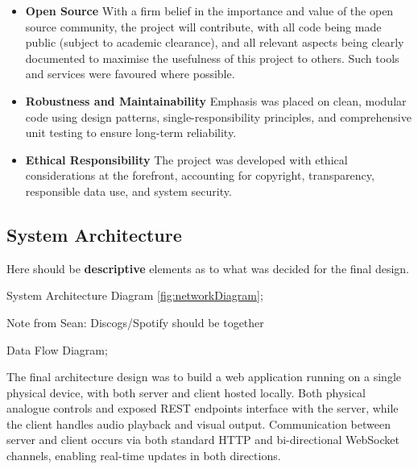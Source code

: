             \begin{itemize}
                \item \textbf{Open Source} With a firm belief in the importance and value of the open source community, the project will contribute, with all code being made public (subject to academic clearance), and all relevant aspects being clearly documented to maximise the usefulness of this project to others. Such tools and services were favoured where possible.
            \end{itemize}
    
            \begin{itemize}
                \item \textbf{Robustness and Maintainability} Emphasis was placed on clean, modular code using design patterns, single-responsibility principles, and comprehensive unit testing to ensure long-term reliability.
            \end{itemize}
    
            \begin{itemize}
                \item \textbf{Ethical Responsibility} The project was developed with ethical considerations at the forefront, accounting for copyright, transparency, responsible data use, and system security.
            \end{itemize}
        
        \subsection{System Architecture} %
    
            \begin{temp}
                Here should be \textbf{descriptive} elements as to what was decided for the final design.
            
                System Architecture Diagram \ref{fig:networkDiagram};
                \begin{temp}Note from Sean: Discogs/Spotify should be together\end{temp}
                
                Data Flow Diagram;
            \end{temp}
    
            The final architecture design was to build a web application running on a single physical device, with both server and client hosted locally. Both physical analogue controls and exposed REST endpoints interface with the server, while the client handles audio playback and visual output. Communication between server and client occurs via both standard HTTP and bi-directional WebSocket channels, enabling real-time updates in both directions.
    

